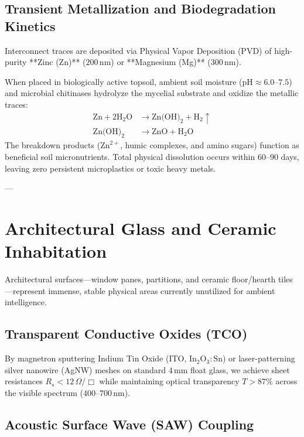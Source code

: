 \documentclass[10pt,twocolumn,letterpaper]{article}
\begin{document}
\subsection{Transient Metallization and Biodegradation Kinetics}

Interconnect traces are deposited via Physical Vapor Deposition (PVD) of high-purity **Zinc (Zn)** ($200\,\text{nm}$) or **Magnesium (Mg)** ($300\,\text{nm}$). 

When placed in biologically active topsoil, ambient soil moisture ($\text{pH} \approx 6.0\text{--}7.5$) and microbial chitinases hydrolyze the mycelial substrate and oxidize the metallic traces:
\begin{align}
\text{Zn} + 2\text{H}_2\text{O} &\longrightarrow \text{Zn(OH)}_2 + \text{H}_2 \uparrow \\
\text{Zn(OH)}_2 &\longrightarrow \text{ZnO} + \text{H}_2\text{O}
\end{align}
The breakdown products ($\text{Zn}^{2+}$, humic complexes, and amino sugars) function as beneficial soil micronutrients. Total physical dissolution occurs within $60\text{--}90$ days, leaving zero persistent microplastics or toxic heavy metals.

---

\section{Architectural Glass and Ceramic Inhabitation}

Architectural surfaces—window panes, partitions, and ceramic floor/hearth tiles—represent immense, stable physical areas currently unutilized for ambient intelligence.

\subsection{Transparent Conductive Oxides (TCO)}

By magnetron sputtering Indium Tin Oxide (ITO, $\text{In}_2\text{O}_3:\text{Sn}$) or laser-patterning silver nanowire (AgNW) meshes on standard $4\,\text{mm}$ float glass, we achieve sheet resistances $R_s < 12\,\Omega/\Box$ while maintaining optical transparency $T > 87\%$ across the visible spectrum ($400\text{--}700\,\text{nm}$).

\subsection{Acoustic Surface Wave (SAW) Coupling}
\end{document}
